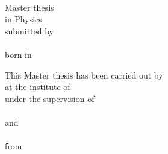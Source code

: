 \begin{titlepage}
    \begin{addmargin}[-1cm]{-3cm}
    \renewcommand{\baselinestretch}{2.00}
    \begin{center}
        \Large  

		\myFaculty \\
		\smallskip
		
		\large
		\myUni

        \hfill

        \vfill

    	\medskip
		
        \vfill
		Master thesis \\ 
		in Physics \\ 
		submitted by \\ 
		\myName \\ 
		born in \myBirthplace  \\
		\myThesisYear 
        

    \end{center}  
  \end{addmargin}    

  
\cleardoublepage  
\begin{center}
  \renewcommand{\baselinestretch}{2.00}
  \Large \bfseries%
    \myTitle 
    
  \par
  \vfill
  \large\normalfont
  This Master thesis has been carried out by \myName \\
  at the institute of \myDepartment \\
  under the supervision of \\
  \myProf \\%
  and \\ 
  \mySecondProf  \\ from \\ \mySecondProfInstitution 
\end{center}\par
\vspace{5\baselineskip}

\renewcommand{\baselinestretch}{1.00}\normalsize  
  
  
  
     
\end{titlepage}   